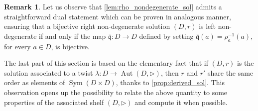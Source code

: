 \documentclass[preprint,1p]{elsarticle}
\numberwithin{equation}{section}
\theoremstyle{definition}               %
\newtheorem{rem}[theor]{Remark}
\newcommand{\tr}{\triangleright}
\DeclareMathOperator{\Sym}{Sym}
\DeclareMathOperator{\Aut}{Aut}
\begin{document}
\begin{rem}
    Let us observe that \cref{lem:rho_nondegenerate_sol} admits a straightforward dual statement which can be proven in analogous manner, ensuring that a bijective right non-degenerate solution $(D,r)$ is left non-degenerate if and only if the map  %
    $\bar{\mathfrak{q}}:D\to D$ defined by setting $\bar{\mathfrak{q}}(a) = \rho^{-1}_a(a)$, for every $a\in D$, is bijective.
\end{rem}

\smallskip

The last part of this section is based on the elementary fact that if $(D,r)$ is the solution associated to a twist $\lambda:D \to \Aut(D,\tr)$, then $r$ and $r'$ share the same order as elements of $\Sym(D \times D)$, thanks to \cref{prop:derived_sol}.
This observation opens up the possibility to relate the above quantity to some properties of the associated shelf $(D,\tr)$ and compute it when possible.
\medskip
\end{document}
